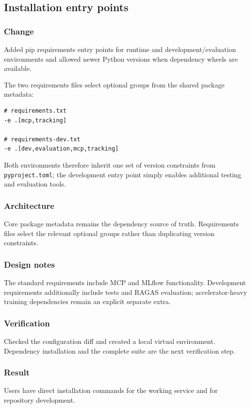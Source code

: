 
\subsection{Installation entry points}


\subsubsection{Change}

Added pip requirements entry points for runtime and development/evaluation environments and allowed newer Python versions when dependency wheels are available.

The two requirements files select optional groups from the shared package metadata:

\begin{verbatim}
# requirements.txt
-e .[mcp,tracking]

# requirements-dev.txt
-e .[dev,evaluation,mcp,tracking]
\end{verbatim}

Both environments therefore inherit one set of version constraints from \texttt{pyproject.toml}; the development entry point simply enables additional testing and evaluation tools.

\subsubsection{Architecture}

Core package metadata remains the dependency source of truth. Requirements files select the relevant optional groups rather than duplicating version constraints.

\subsubsection{Design notes}

The standard requirements include MCP and MLflow functionality. Development requirements additionally include tests and RAGAS evaluation; accelerator-heavy training dependencies remain an explicit separate extra.

\subsubsection{Verification}

Checked the configuration diff and created a local virtual environment. Dependency installation and the complete suite are the next verification step.

\subsubsection{Result}

Users have direct installation commands for the working service and for repository development.


